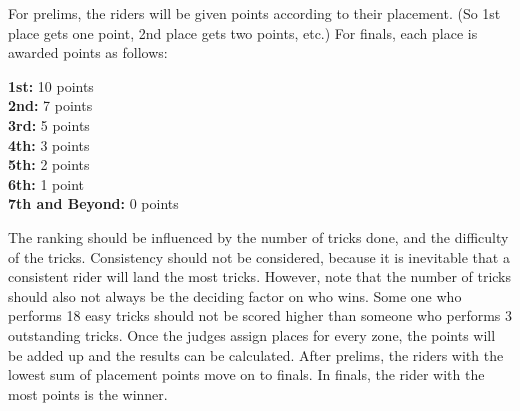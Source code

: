 For prelims, the riders will be given points according to their placement.
(So 1st place gets one point, 2nd place gets two points, etc.)
For finals, each place is awarded points as follows:

\textbf{1st:} 10 points\\
\textbf{2nd:} 7 points\\
\textbf{3rd:} 5 points\\
\textbf{4th:} 3 points\\
\textbf{5th:} 2 points\\
\textbf{6th:} 1 point\\ 
\textbf{7th and Beyond:} 0 points

The ranking should be influenced by the number of tricks done, and the difficulty of the tricks.
Consistency should not be considered, because it is inevitable that a consistent rider will land the most tricks.
However, note that the number of tricks
should also not always be the deciding factor on who wins.
Some one who performs 18 easy tricks should not be scored higher than someone who performs 3 outstanding tricks.
Once the judges assign places for every zone, the points will be added up and the results can be calculated.
After prelims, the riders with the lowest sum of placement points move on to finals.
In finals, the rider with the most points is the winner.
